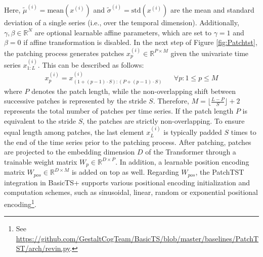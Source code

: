 \documentclass[a4paper,oneside,bibliography=totoc]{scrbook}
\begin{document}
Here, $\tilde{\mu}^{(i)} = \text{mean}(x^{(i)})$ and $\tilde{\sigma}^{(i)} = \text{std}(x^{(i)})$ are the mean and standard deviation of a single series (i.e., over the temporal dimension). Additionally, $\gamma, \beta \in \mathbb{R}^{N}$ are optional learnable affine parameters, which are set to $\gamma = 1$ and $\beta = 0$ if affine transformation is disabled.
In the next step of Figure \ref{fig:Patchtst}, the patching process 
generates patches $x^{(i)}_p \in \mathbb{R}^{P \times M}$ given the univariate time series $x^{(i)}_{1:L}$. This can be described as follows:
\begin{align}
    x^{(i)}_p =  x^{(i)}_{(1+(p-1)\cdot S):(P+(p-1)\cdot S)} && \forall p: 1\leq p \leq M
\end{align}
where $P$ denotes the patch length, while the non-overlapping shift between successive patches is represented by the stride $S$. Therefore, $M = \lfloor  \frac{L-P}{S}\rfloor + 2$ represents the total number of patches per time series. If the patch length $P$ is equivalent to the stride $S$, the patches are strictly non-overlapping.
To ensure equal length among patches, the last element $x^{(i)}_L$ is typically padded $S$ times to the end of the time series prior to the patching process.
After patching, patches are 
projected to the embedding dimension $D$ of the Transformer through 
a trainable weight matrix $W_p \in \mathbb{R}^{D \times P}$. In addition, a learnable position encoding matrix $W_{pos} \in \mathbb{R}^{D \times M}$ is added on top as well.
Regarding $W_{pos}$, the PatchTST integration in BasicTS+ supports various positional encoding initialization and computation schemes, such as sinusoidal, linear, random or exponential positional encoding\footnote{See \href{https://github.com/GestaltCogTeam/BasicTS/blob/master/baselines/PatchTST/arch/revin.py}{https://github.com/GestaltCogTeam/BasicTS/blob/master/baselines/PatchTST/arch/revin.py}.}.
\end{document}

